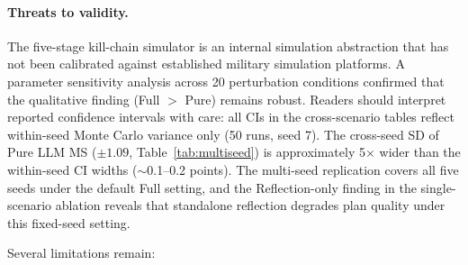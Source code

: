 \paragraph{Threats to validity.} The five-stage kill-chain simulator is an internal simulation abstraction that has not been calibrated against established military simulation platforms. A parameter sensitivity analysis across 20 perturbation conditions confirmed that the qualitative finding (Full $>$ Pure) remains robust. Readers should interpret reported confidence intervals with care: all CIs in the cross-scenario tables reflect within-seed Monte Carlo variance only (50 runs, seed 7). The cross-seed SD of Pure LLM MS ($\pm1.09$, Table~\ref{tab:multiseed}) is approximately 5$\times$ wider than the within-seed CI widths ($\sim$0.1--0.2 points). The multi-seed replication covers all five seeds under the default Full setting, and the Reflection-only finding in the single-scenario ablation reveals that standalone reflection degrades plan quality under this fixed-seed setting.

Several limitations remain:


